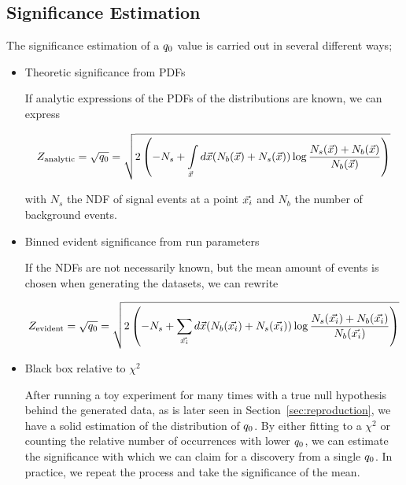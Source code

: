 \documentclass[../../ddppaper2.tex]{subfiles}
\begin{document}
\subsection{Significance Estimation}

The significance estimation of a ${q_{0}}$ value is carried out in several different ways;

\begin{itemize}
    \item Theoretic significance from PDFs

    If analytic expressions of the PDFs of the distributions are known, we can express

    \begin{equation}
    \label{eq:analytic_significance_from_pdfs}
        Z_\text{analytic} = \sqrt{\invllratio} = \sqrt{
            2 \left( -N_s + \int\limits_{\anyevent} d\anyevent (N_b(\anyevent) + N_s(\anyevent)) \log \dfrac{N_s(\anyevent) + N_b(\anyevent)}{N_b(\anyevent)} \right)
        }
    \end{equation}

    with $N_s$ the NDF of signal events at a point ${\vec{{x}_i}}$ and $N_b$ the number of background events.

    \item Binned evident significance from run parameters

    If the NDFs are not necessarily known, but the mean amount of events is chosen when generating the datasets, we can rewrite

    \begin{equation}
        Z_\text{evident} = \sqrt{{q_{0}}} = \sqrt{
            2 \left( -N_s + \sum\limits_{{\vec{{x}_i}}} d\vec{{x}} (N_b({\vec{{x}_i}}) + N_s({\vec{{x}_i}})) \log \dfrac{N_s({\vec{{x}_i}}) + N_b({\vec{{x}_i}})}{N_b({\vec{{x}_i}})} \right)
        }
    \end{equation}

    \item Black box relative to $\chi^2$

    After running a toy experiment for many times with a true null hypothesis behind the generated data, as is later seen in Section~\ref{sec:reproduction}, we have a solid estimation of the distribution of ${q_{0}}$. By either fitting to a $\chi^2$ or counting the relative number of occurrences with lower ${q_{0}}$, we can estimate the significance with which we can claim for a discovery from a single ${q_{0}}$. In practice, we repeat the process and take the significance of the mean.
    
\end{itemize}
\end{document}
